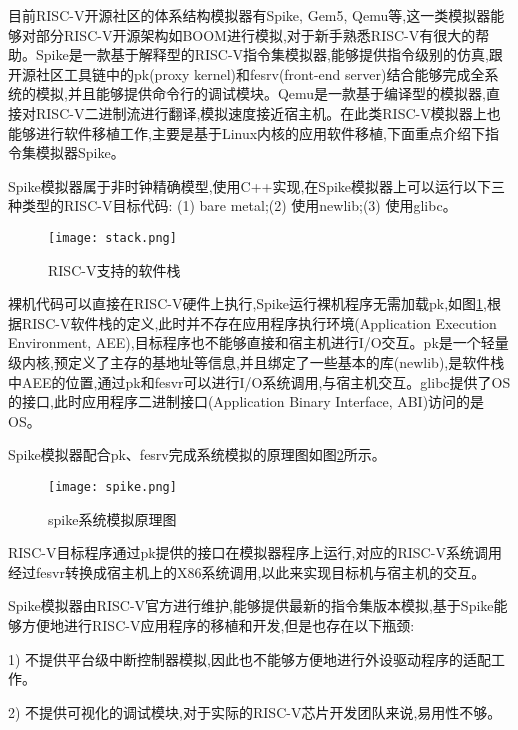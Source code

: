 目前RISC-V开源社区的体系结构模拟器有Spike, Gem5, Qemu\cite{bellard2005qemu}等,这一类模拟器能够对部分RISC-V开源架构如BOOM\cite{celio2016berkeley}进行模拟,对于新手熟悉RISC-V有很大的帮助。Spike是一款基于解释型的RISC-V指令集模拟器,能够提供指令级别的仿真,跟开源社区工具链中的pk(proxy kernel)和fesrv(front-end server)结合能够完成全系统的模拟,并且能够提供命令行的调试模块。Qemu是一款基于编译型的模拟器\cite{varga2010omnet++},直接对RISC-V二进制流进行翻译,模拟速度接近宿主机。在此类RISC-V模拟器上也能够进行软件移植工作,主要是基于Linux内核的应用软件移植,下面重点介绍下指令集模拟器Spike。


Spike模拟器属于非时钟精确模型,使用C++实现,在Spike模拟器上可以运行以下三种类型的RISC-V目标代码: (1) bare metal;(2) 使用newlib;(3) 使用glibc。

\begin{figure}[H]
  \centering
  \texttt{[image: stack.png]}
  \caption{RISC-V支持的软件栈}
  \label{fig:stack}
\end{figure}

裸机代码可以直接在RISC-V硬件上执行,Spike运行裸机程序无需加载pk,如图\ref{fig:stack},根据RISC-V软件栈\cite{黄聪会2012软件移植理论与技术研究,butko2012accuracy}的定义,此时并不存在应用程序执行环境(Application Execution Environment, AEE),目标程序也不能够直接和宿主机进行I/O交互。pk是一个轻量级内核,预定义了主存的基地址等信息,并且绑定了一些基本的库(newlib),是软件栈中AEE的位置,通过pk和fesvr可以进行I/O系统调用,与宿主机交互。glibc提供了OS的接口,此时应用程序二进制接口(Application Binary Interface, ABI)访问的是OS。



Spike模拟器配合pk、fesrv完成系统模拟的原理图如图\ref{fig:spike}所示。
\begin{figure}[H]
  \centering
  \texttt{[image: spike.png]}
  \caption{spike系统模拟原理图}
  \label{fig:spike}
\end{figure}


RISC-V目标程序通过pk提供的接口在模拟器程序上运行,对应的RISC-V系统调用经过fesvr转换成宿主机上的X86系统调用,以此来实现目标机与宿主机的交互。


Spike模拟器由RISC-V官方进行维护,能够提供最新的指令集版本模拟,基于Spike能够方便地进行RISC-V应用程序的移植和开发,但是也存在以下瓶颈:

1) 不提供平台级中断控制器模拟,因此也不能够方便地进行外设驱动程序的适配工作。

2) 不提供可视化的调试模块,对于实际的RISC-V芯片开发团队来说,易用性不够。



